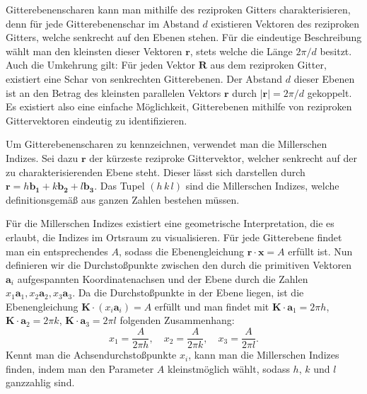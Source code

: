 Gitterebenenscharen kann man mithilfe des reziproken Gitters charakterisieren, denn für jede
Gitterebenenschar im Abstand $d$ existieren Vektoren des reziproken Gitters, welche senkrecht auf den Ebenen stehen.
Für die eindeutige Beschreibung wählt man den kleinsten dieser Vektoren $\mathbf{r}$, stets welche die Länge $2 \pi / d$ besitzt.
Auch die Umkehrung gilt: Für jeden Vektor $\mathbf{R}$ aus dem reziproken Gitter, existiert eine Schar von senkrechten
Gitterebenen.
Der Abstand $d$ dieser Ebenen ist an den Betrag des kleinsten parallelen Vektors $\mathbf{r}$ durch $\lvert \mathbf{r}
\rvert=2\pi  /d$ gekoppelt.
Es existiert also eine einfache Möglichkeit, Gitterebenen mithilfe von reziproken Gittervektoren eindeutig zu
identifizieren. \autocite[113]{Ashcroft}

Um Gitterebenenscharen zu kennzeichnen, verwendet man die Millerschen Indizes.
Sei dazu $\mathbf{r}$ der kürzeste reziproke Gittervektor, welcher senkrecht auf der zu charakterisierenden Ebene steht.
Dieser lässt sich darstellen durch $ \mathbf{r} = h \mathbf{b_1} + k \mathbf{b_2} + l \mathbf{b_3}$.
Das Tupel $(h\, k\,l)$ sind die Millerschen Indizes, welche definitionsgemäß aus ganzen Zahlen bestehen müssen.


Für die Millerschen Indizes existiert eine geometrische Interpretation, die es erlaubt, die Indizes im Ortsraum zu
visualisieren.
Für jede Gitterebene findet man ein entsprechendes $A$, sodass die Ebenengleichung $\mathbf{r} \cdot \mathbf{x} = A$
erfüllt ist.
Nun definieren wir die Durchstoßpunkte zwischen den durch die primitiven Vektoren $\mathbf{a}_i$ aufgespannten
Koordinatenachsen und der Ebene durch die Zahlen $x_{1}\mathbf{a}_{1}, x_{2}\mathbf{a}_{2}, x_{3}\mathbf{a}_{3}$.
Da die Durchstoßpunkte in der Ebene liegen, ist die Ebenengleichung $\mathbf{K}\cdot(x_{i}\mathbf{a}_{i})=A$ erfüllt und
man findet mit $\mathbf{K}\cdot\mathbf{a}_{1}=2\pi h$, $\mathbf{K}\cdot \mathbf{a}_{2}=2\pi k$,
$ \mathbf{K}\cdot \mathbf{a}_{3}=2\pi l$ folgenden Zusammenhang:
\begin{equation*}
    x_{1}=\frac{A}{2\pi h}, \quad x_{2}=\frac{A}{2\pi k}, \quad x_{3} =\frac{A}{2\pi l}.
\end{equation*}
Kennt man die Achsendurchstoßpunkte $x_i$, kann man die Millerschen Indizes finden, indem man den Parameter $A$
kleinstmöglich wählt, sodass $h$, $k$ und $l$ ganzzahlig sind. \autocite[115]{Ashcroft}

